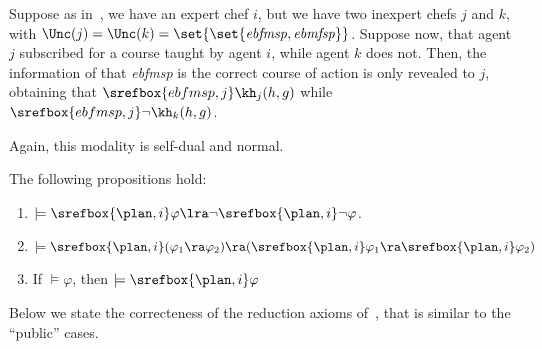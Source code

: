 \medskip 

\begin{example}
Suppose as in~, we have an expert chef $i$, but we have two inexpert chefs $j$ and $k$, with $\Unc(j)=\Unc(k)=\set{\set{\mathit{ebfmsp},\mathit{ebmfsp}}}$. Suppose now, that agent $j$ subscribed for a course taught by agent $i$, while agent $k$ does not. Then, the information of that \textit{ebfmsp} is the correct course of action is only revealed to $j$, obtaining that $\srefbox{ebfmsp,j}\kh_j(h,g)$ while $\srefbox{ebfmsp,j}\neg\kh_k(h,g)$.
\end{example}

Again, this modality is self-dual and normal.

\medskip 

\begin{proposition} The following propositions hold:
\begin{enumerate}
\item $\models \srefbox{\plan,i}\varphi \lra \neg\srefbox{\plan,i}\neg\varphi$. 
\item $\models \srefbox{\plan,i}(\varphi_1 \ra \varphi_2) \ra (\srefbox{\plan,i}\varphi_1 \ra \srefbox{\plan,i}\varphi_2)$
\item If $\models \varphi$, then $\models \srefbox{\plan,i}\varphi$
\end{enumerate}
\end{proposition}

\medskip 

Below we state the correcteness of the reduction axioms of~, that is similar to the ``public'' cases. 

\medskip 

